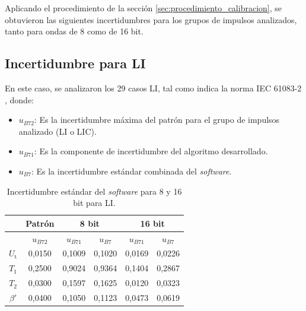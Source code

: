 Aplicando el procedimiento de la sección \ref{sec:procedimiento_calibracion}, se obtuvieron las siguientes incertidumbres para los grupos de impulsos analizados, tanto para ondas de \num{8} como de \num{16} bit.

\subsection*{Incertidumbre para LI}
\label{subsec:incertidumbre_software_li}

En este caso, se analizaron los \num{29} casos LI, tal como indica la norma IEC 61083-2 \cite{iec61083_2}, donde:

\begin{itemize}
    \item \textbf{$u_{B72}$}: Es la incertidumbre máxima del patrón \cite{iec61083_2} para el grupo de impulsos analizado (LI o LIC).
    \item \textbf{$u_{B71}$}: Es la componente de incertidumbre del algoritmo desarrollado.
    \item \textbf{$u_{B7}$}: Es la incertidumbre estándar combinada del \emph{software}.
\end{itemize}

\vspace{3\baselineskip}
\begin{table}[H]
    \centering
    \begin{tabular}{@{}cccccc@{}}
        \toprule
                              & \textbf{Patrón}    & \multicolumn{2}{c}{\textbf{8 bit}}     & \multicolumn{2}{c}{\textbf{16 bit}}    \\ \midrule
                              & \textbf{$u_{B72}$} & \textbf{$u_{B71}$} & \textbf{$u_{B7}$} & \textbf{$u_{B71}$} & \textbf{$u_{B7}$} \\ \midrule
        \textbf{$U_\text{t}$} & 0,0150             & 0,1009             & 0,1020            & 0,0169             & 0,0226            \\ \midrule
        \textbf{$T_1$}        & 0,2500             & 0,9024             & 0,9364            & 0,1404             & 0,2867            \\ \midrule
        \textbf{$T_2$}        & 0,0300             & 0,1597             & 0,1625            & 0,0120             & 0,0323            \\ \midrule
        \textbf{$\beta'$}     & 0,0400             & 0,1050             & 0,1123            & 0,0473             & 0,0619            \\ \bottomrule
        \end{tabular}
    \caption{Incertidumbre estándar del \emph{software} para 8 y 16 bit para LI.}
    \label{tab:incertidumbre_software_li}
\end{table}
\vspace{3\baselineskip}

